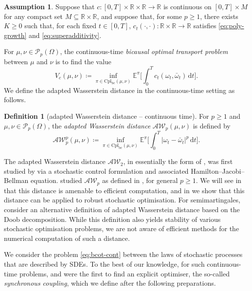\documentclass[onseside, final]{amsart}
\theoremstyle{definition}
\newtheorem{definition}[theorem]{Definition}
\newtheorem{assumption}[theorem]{Assumption}
\newcommand{\Pc}{\mathcal P}
\newcommand{\R}{\mathbb R}
\newcommand{\E}{\mathbb E}
\newcommand{\D}{\,\mathrm{d}}
\newcommand{\AW}{\mathcal A\mathcal W}
\newcommand{\cpl}{\mathrm{Cpl}}
\newcommand{\cplba}{\cpl_{\mathrm{bc}}}
\numberwithin{equation}{section}
\begin{document}
			\begin{assumption}\label{ass:cost}
				Suppose that $c \colon [0, T] \times \R \times \R \to \R$ is continuous on $[0, T] \times M$ for any compact set $M \subseteq \R \times \R$, and suppose that, for some $p \geq 1$, there exists $K \geq 0$ such that, for each fixed $t \in [0, T]$, $c_t(\cdot, \cdot) \colon \R \times \R \to \R$ satisfies \eqref{eq:poly-growth} and \eqref{eq:superadditivity}.
			\end{assumption}
			For $\mu, \nu \in \Pc_p(\Omega)$, the continuous-time \emph{bicausal optimal transport problem} between $\mu$ and $\nu$ is to find the value
			\begin{equation}\tag{BCOT}\label{eq:bcot-cont}
				V_c(\mu, \nu) \coloneqq \inf_{\pi \in \cplba(\mu, \nu)}\E^\pi\biggl[\int_0^T c_t(\omega_t, \bar \omega_t)\D t\biggr].
			\end{equation}
			We define the adapted Wasserstein distance in the continuous-time setting as follows.
			\begin{definition}[adapted Wasserstein distance -- continuous time]\label{def:aw}
			For $p \geq 1$ and $\mu, \nu \in \Pc_p(\Omega)$, the \emph{adapted Wasserstein distance} $\AW_p(\mu, \nu)$ is defined by
				\begin{equation}\label{eq:adapted-wasserstein}
					\AW_p^p(\mu, \nu) \coloneqq \inf_{\pi \in \cplba(\mu, \nu)}\E^\pi\biggl[\int_0^T |\omega_t - \bar \omega_t |^p \D t\biggr].
				\end{equation}
			\end{definition}
			The adapted Wasserstein distance $\AW_2$, in essentially the form of , was first studied by \citet{BiTa19} via a stochastic control formulation and associated Hamilton--Jacobi--Bellman equation. \citet{BaKaRo22} studied $\AW_p$ as defined in , for general $p \geq 1$. We will see in  that this distance is amenable to efficient computation, and in  we show that this distance can be applied to robust stochastic optimisation. For semimartingales, \citet{BaBaBeEd19a} consider an alternative definition of adapted Wasserstein distance based on the Doob decomposition. While this definition also yields stability of various stochastic optimisation problems, we are not aware of efficient methods for the numerical computation of such a distance.
			
			We consider the problem \eqref{eq:bcot-cont} between the laws of stochastic processes that are described by SDEs. To the best of our knowledge, for such continuous-time problems, \citet{BiTa19} and \citet{BaBaBeEd19a} were the first to find an explicit optimiser, the so-called \emph{synchronous coupling}, which we define after the following preparations.
			
\end{document}
